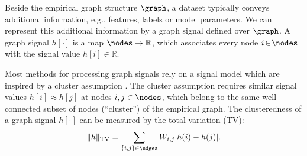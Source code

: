 \documentclass[12pt]{report}
\begin{document}
%
%

Beside the empirical graph structure $\graph$, a dataset typically conveys additional information, e.g., 
features, labels or model parameters. We can represent this additional information by a graph signal defined over $\graph$. 
A graph signal $h[\cdot]$ is a map $\nodes \rightarrow \mathbb{R}$, which associates every node 
$i\!\in\!\nodes$ with the signal value $h[i] \!\in\! \mathbb{R}$. 

Most methods for processing graph signals rely on a signal model which are inspired by a cluster 
assumption \cite{SemiSupervisedBook}. The cluster assumption requires similar signal values $h[i] \approx h[j]$ 
at nodes $i,j \in \nodes$, which belong to the same well-connected subset of nodes (``cluster'') of the empirical graph. 
The clusteredness of a graph signal $h[\cdot]$ can be measured by the total variation (TV): 
\begin{equation}
\label{equ_def_TV}
 \| h \|_{\rm TV} = \sum_{\{i,j\} \in \edges} W_{i,j} |h(i) - h(j)|. 
\end{equation} 
 
\end{document}
